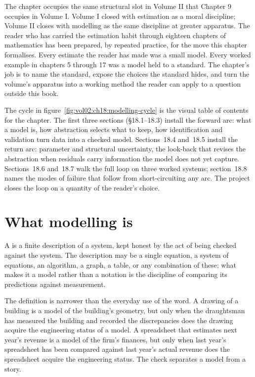 The chapter occupies the same structural slot in Volume II that
Chapter 9 occupies in Volume I. Volume I closed with estimation as a
moral discipline; Volume II closes with modelling as the same
discipline at greater apparatus. The reader who has carried the
estimation habit through eighteen chapters of mathematics has been
prepared, by repeated practice, for the move this chapter formalises.
Every estimate the reader has made was a small model. Every worked
example in chapters 5 through 17 was a model held to a standard. The
chapter's job is to name the standard, expose the choices the standard
hides, and turn the volume's apparatus into a working method the
reader can apply to a question outside this book.



The cycle in figure~\ref{fig:vol02:ch18:modelling-cycle} is the
visual table of contents for the chapter. The first three sections
(\S 18.1--18.3) install the forward arc: what a model is, how
abstraction selects what to keep, how identification and validation
turn data into a checked model. Sections~18.4 and~18.5 install the
return arc: parameter and structural uncertainty, the look-back that
revises the abstraction when residuals carry information the model
does not yet capture. Sections~18.6 and~18.7 walk the full loop on
three worked systems; section~18.8 names the modes of failure that
follow from short-circuiting any arc. The project closes the loop on
a quantity of the reader's choice.

\section{What modelling is}

A  is a finite description of a system, kept honest by
the act of being checked against the system. The description may be a
single equation, a system of equations, an algorithm, a graph, a table,
or any combination of these; what makes it a model rather than a
notation is the discipline of comparing its predictions against
measurement.

The definition is narrower than the everyday use of the word. A drawing
of a building is a model of the building's geometry, but only when the
draughtsman has measured the building and recorded the discrepancies
does the drawing acquire the engineering status of a model. A
spreadsheet that estimates next year's revenue is a model of the firm's
finances, but only when last year's spreadsheet has been compared
against last year's actual revenue does the spreadsheet acquire the
engineering status. The check separates a model from a story.

